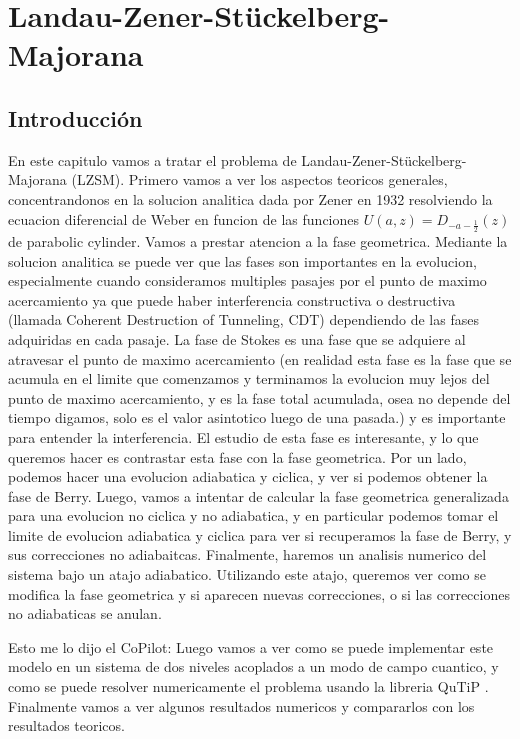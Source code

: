 \chapter{Landau-Zener-Stückelberg-Majorana}
\label{ch7_lzsm}


\pagestyle{fancy}
\fancyhf{}
\fancyhead[LE]{\nouppercase{\rightmark\hfill}}
\fancyhead[RO]{\nouppercase{\leftmark\hfill}}
\fancyfoot[LE,RO]{\hfill\thepage\hfill}

\section{Introducción}
En este capitulo vamos a tratar el problema de Landau-Zener-Stückelberg-Majorana (LZSM). Primero vamos a ver los aspectos teoricos generales, concentrandonos en la solucion analitica dada por Zener en 1932 \cite{zener1932non} resolviendo la ecuacion diferencial de Weber en funcion de las funciones $U(a,z)=D_{-a-\frac{1}{2}}(z)$ de parabolic cylinder. Vamos a prestar atencion a la fase geometrica. Mediante la solucion analitica se puede ver que las fases son importantes en la evolucion, especialmente cuando consideramos multiples pasajes por el punto de maximo acercamiento ya que puede haber interferencia constructiva o destructiva (llamada Coherent Destruction of Tunneling, CDT) dependiendo de las fases adquiridas en cada pasaje. La fase de Stokes es una fase que se adquiere al atravesar el punto de maximo acercamiento (en realidad esta fase es la fase que se acumula en el limite que comenzamos y terminamos la evolucion muy lejos del punto de maximo acercamiento, y es la fase total acumulada, osea no depende del tiempo digamos, solo es el valor asintotico luego de una pasada.) y es importante para entender la interferencia. El estudio de esta fase es interesante, y lo que queremos hacer es contrastar esta fase con la fase geometrica. Por un lado, podemos hacer una evolucion adiabatica y ciclica, y ver si podemos obtener la fase de Berry. Luego, vamos a intentar de calcular la fase geometrica generalizada para una evolucion no ciclica y no adiabatica, y en particular podemos tomar el limite de evolucion adiabatica y ciclica para ver si recuperamos la fase de Berry, y sus correcciones no adiabaitcas. Finalmente, haremos un analisis numerico del sistema bajo un atajo adiabatico. Utilizando este atajo, queremos ver como se modifica la fase geometrica y si aparecen nuevas correcciones, o si las correcciones no adiabaticas se anulan. 
  
Esto me lo dijo el CoPilot: Luego vamos a ver como se puede implementar este modelo en un sistema de dos niveles acoplados a un modo de campo cuantico, y como se puede resolver numericamente el problema usando la libreria QuTiP \cite{johansson2012qutip,johansson2013qutip2}. Finalmente vamos a ver algunos resultados numericos y compararlos con los resultados teoricos.

